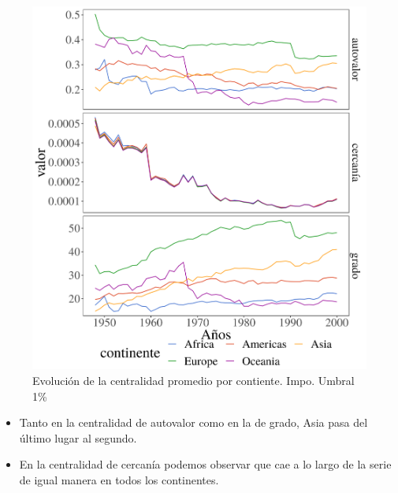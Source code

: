 \documentclass[compress]{beamer}
\begin{document}
\begin{frame}
	\begin{figure}
		\centering		\includegraphics[width=0.75\linewidth]{1950_2000_continent_all}
		\caption{Evolución de la centralidad promedio por contiente. Impo. Umbral 1\%}
		\label{fig:centralidad_LP}
	\end{figure}
\end{frame}

\begin{frame}
\begin{itemize}[label=\faRebel]
	\item Tanto en la centralidad de autovalor como en la de grado, Asia pasa del último lugar al segundo. 
	\item En la centralidad de cercanía podemos observar que cae a lo largo de la serie de igual manera en todos los continentes.
\end{itemize}
\end{frame}
\end{document}
